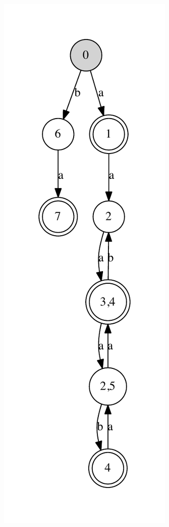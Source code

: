 \documentclass[12pt]{article}
\begin{document}
      \includegraphics{state_machine2_2.pdf}
\end{document}
